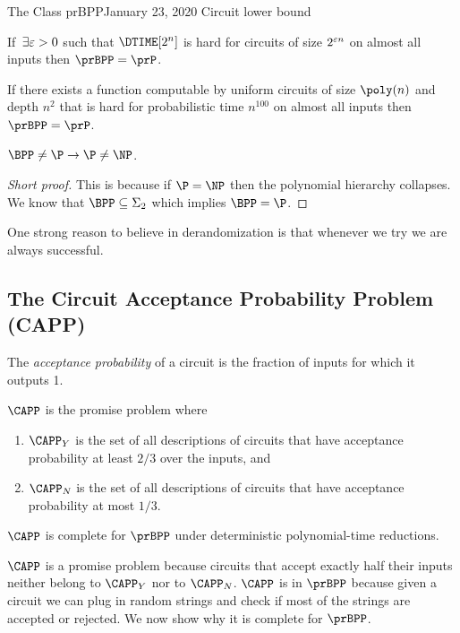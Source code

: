 \begin{lecture}{1}{The Class prBPP}{January 23, 2020}
Circuit lower bound
\begin{proposition}[IW97]
	If $\,\exists \varepsilon>0$ such that $\DTIME[2^n]$ is hard for circuits of size $2^{\varepsilon n}$ on almost all inputs then $\prBPP=\prP$.
\end{proposition}

\begin{proposition}
	If there exists a function computable by uniform circuits of size $\poly(n)$ and depth $n^2$ that is hard for probabilistic time $n^{100}$ on almost all inputs then $\prBPP = \prP$.
\end{proposition}

\begin{proposition}
	$\BPP \neq \P \rightarrow \P \neq \NP$.
\end{proposition}
\begin{proof}[Short proof]
This is because if $\P = \NP$ then the polynomial hierarchy collapses. We know that $\BPP \subseteq \Sigma_2$ which implies $\BPP = \P$.
\end{proof}

One strong reason to believe in derandomization is that whenever we try we are always successful. 

\subsection{The Circuit Acceptance Probability Problem (CAPP)}

The \emph{acceptance probability} of a circuit is the fraction of inputs for
which it outputs 1.

\begin{definition}[$\CAPP$]
  $\CAPP$ is the promise problem where
  \begin{enumerate}
    \item $\CAPP_Y$ is the set of all descriptions of circuits that have
      acceptance probability at least $2/3$ over the inputs, and
    \item $\CAPP_N$ is the set of all descriptions of circuits that have
      acceptance probability at most $1/3$.
  \end{enumerate}
\end{definition}

\begin{theorem}\label{thm:complete}
  $\CAPP$ is complete for $\prBPP$ under deterministic polynomial-time reductions.
\end{theorem}

$\CAPP$ is a promise problem because circuits that accept exactly half their inputs neither belong to $\CAPP_Y$ nor to $\CAPP_N$. $\CAPP$ is in $\prBPP$ because given a circuit we can plug in random strings and check if most of the strings are accepted or rejected. We now show why it is complete for $\prBPP$.


\end{lecture}
